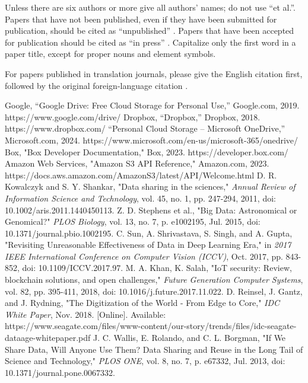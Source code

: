 \documentclass[conference]{IEEEtran}
\begin{document}
Unless there are six authors or more give all authors' names; do not use 
``et al.''. Papers that have not been published, even if they have been 
submitted for publication, should be cited as ``unpublished'' \cite{b4}. Papers 
that have been accepted for publication should be cited as ``in press'' \cite{b5}. 
Capitalize only the first word in a paper title, except for proper nouns and 
element symbols.

For papers published in translation journals, please give the English 
citation first, followed by the original foreign-language citation \cite{b6}.

\begin{thebibliography}{00}
 Google, “Google Drive: Free Cloud Storage for Personal Use,” Google.com, 2019. https://www.google.com/drive/
 Dropbox, “Dropbox,” Dropbox, 2018. https://www.dropbox.com/
 “Personal Cloud Storage – Microsoft OneDrive,” Microsoft.com, 2024. https://www.microsoft.com/en-us/microsoft-365/onedrive/
 Box, "Box Developer Documentation," Box, 2023. https://developer.box.com/
 Amazon Web Services, "Amazon S3 API Reference," Amazon.com, 2023. https://docs.aws.amazon.com/AmazonS3/latest/API/Welcome.html
 D. R. Kowalczyk and S. Y. Shankar, "Data sharing in the sciences," \textit{Annual Review of Information Science and Technology}, vol. 45, no. 1, pp. 247-294, 2011, doi: 10.1002/aris.2011.1440450113.
 Z. D. Stephens et al., "Big Data: Astronomical or Genomical?" \textit{PLOS Biology}, vol. 13, no. 7, p. e1002195, Jul. 2015, doi: 10.1371/journal.pbio.1002195.
 C. Sun, A. Shrivastava, S. Singh, and A. Gupta, "Revisiting Unreasonable Effectiveness of Data in Deep Learning Era," in \textit{2017 IEEE International Conference on Computer Vision (ICCV)}, Oct. 2017, pp. 843-852, doi: 10.1109/ICCV.2017.97.
 M. A. Khan, K. Salah, "IoT security: Review, blockchain solutions, and open challenges," \textit{Future Generation Computer Systems}, vol. 82, pp. 395-411, 2018, doi: 10.1016/j.future.2017.11.022.
 D. Reinsel, J. Gantz, and J. Rydning, "The Digitization of the World - From Edge to Core," \textit{IDC White Paper}, Nov. 2018. [Online]. Available: https://www.seagate.com/files/www-content/our-story/trends/files/idc-seagate-dataage-whitepaper.pdf
 J. C. Wallis, E. Rolando, and C. L. Borgman, "If We Share Data, Will Anyone Use Them? Data Sharing and Reuse in the Long Tail of Science and Technology," \textit{PLOS ONE}, vol. 8, no. 7, p. e67332, Jul. 2013, doi: 10.1371/journal.pone.0067332.

\end{thebibliography}
\end{document}
